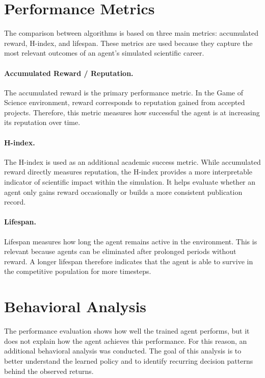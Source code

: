 \documentclass[english,bachelor]{hsluthesis}
\begin{document}
\section{Performance Metrics}

The comparison between algorithms is based on three main metrics: accumulated reward, H-index, and lifespan. These metrics are used because they capture the most relevant outcomes of an agent's simulated scientific career.

\paragraph{Accumulated Reward / Reputation.}
The accumulated reward is the primary performance metric. In the Game of Science environment, reward corresponds to reputation gained from accepted projects. Therefore, this metric measures how successful the agent is at increasing its reputation over time.

\paragraph{H-index.}
The H-index is used as an additional academic success metric. While accumulated reward directly measures reputation, the H-index provides a more interpretable indicator of scientific impact within the simulation. It helps evaluate whether an agent only gains reward occasionally or builds a more consistent publication record.

\paragraph{Lifespan.}
Lifespan measures how long the agent remains active in the environment. This is relevant because agents can be eliminated after prolonged periods without reward. A longer lifespan therefore indicates that the agent is able to survive in the competitive population for more timesteps.

\section{Behavioral Analysis}

The performance evaluation shows how well the trained agent performs, but it does not explain how the agent achieves this performance. For this reason, an additional behavioral analysis was conducted. The goal of this analysis is to better understand the learned policy and to identify recurring decision patterns behind the observed returns.
\end{document}
